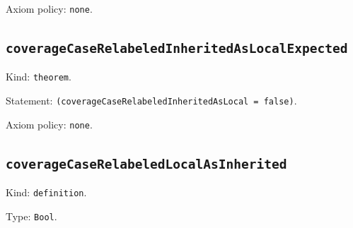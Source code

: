 \documentclass[11pt]{article}
\begin{document}
\noindent Axiom policy: \texttt{none}.\par
\subsection*{\texttt{coverageCaseRelabeledInheritedAsLocalExpected}}
\noindent Kind: \texttt{theorem}.\par
\noindent Statement: \texttt{(coverageCaseRelabeledInheritedAsLocal = false)}.\par
\noindent Axiom policy: \texttt{none}.\par
\subsection*{\texttt{coverageCaseRelabeledLocalAsInherited}}
\noindent Kind: \texttt{definition}.\par
\noindent Type: \texttt{Bool}.\par
\end{document}
